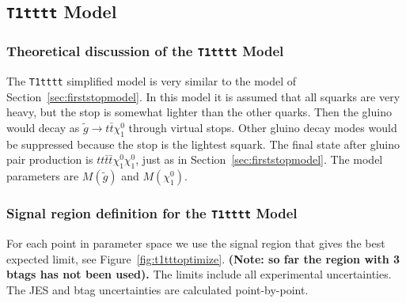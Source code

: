

\clearpage


\subsection{{\tt T1tttt} Model}
\label{t1ttmodel}

\subsubsection{Theoretical discussion of the {\tt T1tttt} Model}
\label{sec:t1tttheory}
The {\tt T1tttt} simplified model\cite{T1tttt} is very similar to the model of 
Section~\ref{sec:firststopmodel}.  In this model it is assumed that all squarks 
are very heavy, but the stop is somewhat lighter than the other 
quarks\cite{stopVirtual}\cite{stopVirtualPRD}.
Then the gluino would decay as $\widetilde{g} \to t\bar{t}\chi_1^0$ through virtual stops.
Other gluino decay modes would be suppressed because the stop is the lightest squark.
The final state after gluino pair production is $tt\bar{t}\bar{t}\chi_1^0\chi_1^0$,
just as in Section~\ref{sec:firststopmodel}.
The model parameters are $M(\widetilde{g})$ and $M(\chi_1^0)$.



\subsubsection{Signal region definition for the {\tt T1tttt} Model}
\label{sec:t1ttttdefinition}
For each point in parameter space we use the signal region that gives
the best expected limit, see Figure~\ref{fig:t1tttoptimize}.
{\bf (Note: so far the region with 3 btags has not been used).}
The limits include all experimental 
uncertainties.   The JES and btag uncertainties are calculated point-by-point.


